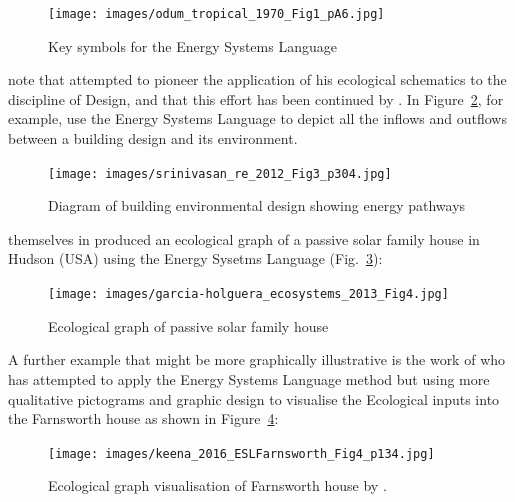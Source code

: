 \begin{figure}[H]
    \centering
    \texttt{[image: images/odum\_tropical\_1970\_Fig1\_pA6.jpg]}
    \caption{Key symbols for the Energy Systems Language \cite[p.~A6]{odum_tropical_1970a}}
    \label{fig:odum:tropical}
\end{figure}

\citeauthor{holguera_ecomimetics_2014} note that \cite{odum_material_2003} attempted to pioneer the application of his ecological schematics to the discipline of Design, and that this effort has been continued by \cite{srinivasan_redefining_2012}. In Figure~\ref{fig:srinivasan:re}, for example, \citeauthor{srinivasan_redefining_2012} use the Energy Systems Language to depict all the inflows and outflows between a building design and its environment. 

\begin{figure}[H]
    \centering
    \texttt{[image: images/srinivasan\_re\_2012\_Fig3\_p304.jpg]}
    \caption{Diagram of building environmental design showing energy pathways \cite[Fig.~3, p.~304]{srinivasan_redefining_2012}}
    \label{fig:srinivasan:re}
\end{figure}


\citeauthor{holguera_ecomimetics_2014} themselves in \citeyear{garcia-holguera_ecosystems_2013} produced an ecological graph of a passive solar family house in Hudson (USA) using the Energy Sysetms Language (Fig.~\ref{fig:garcia:hudson}):

\begin{figure}[H]
    \centering
    \texttt{[image: images/garcia-holguera\_ecosystems\_2013\_Fig4.jpg]}
    \caption{Ecological graph of passive solar family house \cite[Fig.~4]{garcia-holguera_ecosystems_2013}}
    \label{fig:garcia:hudson}
\end{figure}

A further example that might be more graphically illustrative is the work of \citeauthor{keena_visualization_2016} who has attempted to apply the Energy Systems Language method but using more qualitative pictograms and graphic design to visualise the Ecological inputs into the Farnsworth house \citep{keena_visualization_2016} as shown in Figure~\ref{fig:farnsworth}: 

\begin{figure}[H]
    \centering
    \texttt{[image: images/keena\_2016\_ESLFarnsworth\_Fig4\_p134.jpg]}
    \caption{Ecological graph visualisation of Farnsworth house by \citet[Fig.~4, p.~134]{keena_visualization_2016}.}
    \label{fig:farnsworth}
\end{figure}

